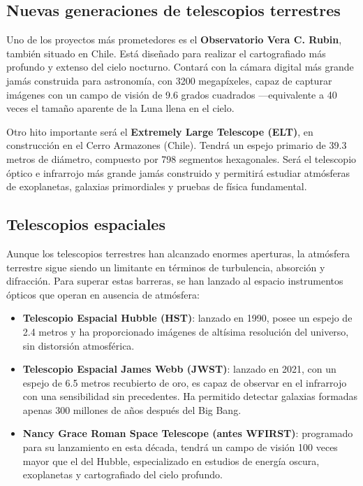 \subsection*{Nuevas generaciones de telescopios terrestres}

Uno de los proyectos más prometedores es el \textbf{Observatorio Vera C. Rubin}, también situado en Chile. Está diseñado para realizar el cartografiado más profundo y extenso del cielo nocturno. Contará con la cámara digital más grande jamás construida para astronomía, con 3200 megapíxeles, capaz de capturar imágenes con un campo de visión de 9.6 grados cuadrados —equivalente a 40 veces el tamaño aparente de la Luna llena en el cielo.

Otro hito importante será el \textbf{Extremely Large Telescope (ELT)}, en construcción en el Cerro Armazones (Chile). Tendrá un espejo primario de 39.3 metros de diámetro, compuesto por 798 segmentos hexagonales. Será el telescopio óptico e infrarrojo más grande jamás construido y permitirá estudiar atmósferas de exoplanetas, galaxias primordiales y pruebas de física fundamental.

\subsection*{Telescopios espaciales}

Aunque los telescopios terrestres han alcanzado enormes aperturas, la atmósfera terrestre sigue siendo un limitante en términos de turbulencia, absorción y difracción. Para superar estas barreras, se han lanzado al espacio instrumentos ópticos que operan en ausencia de atmósfera:

\begin{itemize}
	\item \textbf{Telescopio Espacial Hubble (HST)}: lanzado en 1990, posee un espejo de 2.4 metros y ha proporcionado imágenes de altísima resolución del universo, sin distorsión atmosférica.
	
	\item \textbf{Telescopio Espacial James Webb (JWST)}: lanzado en 2021, con un espejo de 6.5 metros recubierto de oro, es capaz de observar en el infrarrojo con una sensibilidad sin precedentes. Ha permitido detectar galaxias formadas apenas 300 millones de años después del Big Bang.
	
	\item \textbf{Nancy Grace Roman Space Telescope (antes WFIRST)}: programado para su lanzamiento en esta década, tendrá un campo de visión 100 veces mayor que el del Hubble, especializado en estudios de energía oscura, exoplanetas y cartografiado del cielo profundo.
\end{itemize}


